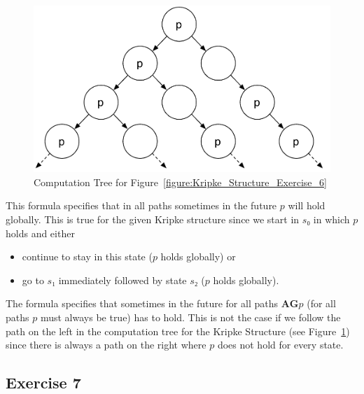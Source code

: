 \documentclass[a4paper, 12pt]{article}
\begin{document}
\begin{figure}[htbp]
    \centering
        \includegraphics[width=.7\textwidth]
            {Figures/Computation Tree Exercise 6.pdf}
    \caption{Computation Tree for
             Figure~\ref{figure:Kripke_Structure_Exercise_6}}
    \label{figure:Computation_Tree_Exercise_6}
\end{figure}

\begin{description}[style=multiline, leftmargin=3cm]

    \item[$s₀⊧\mathbf{AF}(\mathbf{G} p)$] This formula specifies that in all
    paths sometimes in the future $p$ will hold globally. This is true for the
    given Kripke structure since we start in $s₀$ in which $p$ holds and either

        \begin{itemize}

            \item continue to stay in this state ($p$ holds globally) or

            \item go to $s₁$ immediately followed by state $s₂$ ($p$ holds
            globally).

        \end{itemize}

    \item[$s₀⊧\mathbf{AF}(\mathbf{AG} p)$] The formula specifies that
    sometimes in the future for all paths $\mathbf{AG} p$ (for all paths $p$
    must always be true) has to hold. This is not the case if we follow the
    path on the left in the computation tree for the Kripke Structure (see
    Figure~\ref{figure:Computation_Tree_Exercise_6}) since there is always a
    path on the right where $p$ does not hold for every state.

\end{description}

\subsection{Exercise 7}
\end{document}
